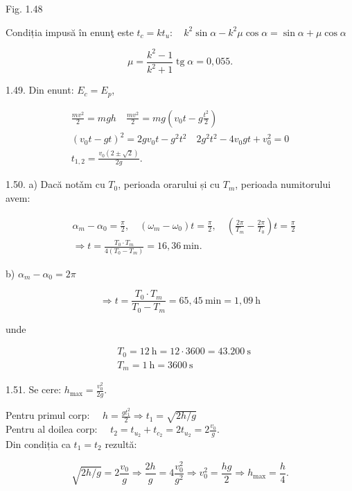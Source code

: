 \documentclass[10pt]{article}
\begin{document}
Fig. 1.48

Condiția impusă în enunţ este $t_{c}=k t_{u}: \quad k^{2} \sin \alpha-k^{2} \mu \cos \alpha=\sin \alpha+\mu \cos \alpha$

$$
\mu=\frac{k^{2}-1}{k^{2}+1} \operatorname{tg} \alpha=0,055 .
$$

1.49. Din enunt: $E_{c}=E_{p}$,

$$
\begin{gathered}
\frac{m v^{2}}{2}=m g h \quad \frac{m v^{2}}{2}=m g\left(v_{0} t-g \frac{t^{2}}{2}\right) \\
\left(v_{0} t-g t\right)^{2}=2 g v_{0} t-g^{2} t^{2} \quad 2 g^{2} t^{2}-4 v_{0} g t+v_{0}^{2}=0 \\
t_{1,2}=\frac{v_{0}(2 \pm \sqrt{2})}{2 g} .
\end{gathered}
$$

1.50. a) Dacă notǎm cu $T_{0}$, perioada orarului și cu $T_{m}$, perioada numitorului avem:

$$
\begin{aligned}
& \alpha_{m}-\alpha_{0}=\frac{\pi}{2}, \quad\left(\omega_{m}-\omega_{0}\right) t=\frac{\pi}{2}, \quad\left(\frac{2 \pi}{T_{m}}-\frac{2 \pi}{T_{0}}\right) t=\frac{\pi}{2} \\
& \Rightarrow t=\frac{T_{0} \cdot T_{m}}{4\left(T_{0}-T_{m}\right)}=16,36 \mathrm{~min} .
\end{aligned}
$$

b) $\alpha_{m}-\alpha_{0}=2 \pi$

$$
\Rightarrow t=\frac{T_{0} \cdot T_{m}}{T_{0}-T_{m}}=65,45 \mathrm{~min}=1,09 \mathrm{~h}
$$

unde

$$
\begin{aligned}
& T_{0}=12 \mathrm{~h}=12 \cdot 3600=43.200 \mathrm{~s} \\
& T_{m}=1 \mathrm{~h}=3600 \mathrm{~s}
\end{aligned}
$$

1.51. Se cere: $h_{\max }=\frac{v_{0}^{2}}{2 g}$.

Pentru primul corp: $\quad h=\frac{g t_{1}^{2}}{2} \Rightarrow t_{1}=\sqrt{2 h / g}$\\
Pentru al doilea corp: $\quad t_{2}=t_{u_{2}}+t_{c_{2}}=2 t_{u_{2}}=2 \frac{v_{0}}{g}$.\\
Din condiția ca $t_{1}=t_{2}$ rezultă:

$$
\sqrt{2 h / g}=2 \frac{v_{0}}{g} \Rightarrow \frac{2 h}{g}=4 \frac{v_{0}^{2}}{g^{2}} \Rightarrow v_{0}^{2}=\frac{h g}{2} \Rightarrow h_{\max }=\frac{h}{4} .
$$
\end{document}
